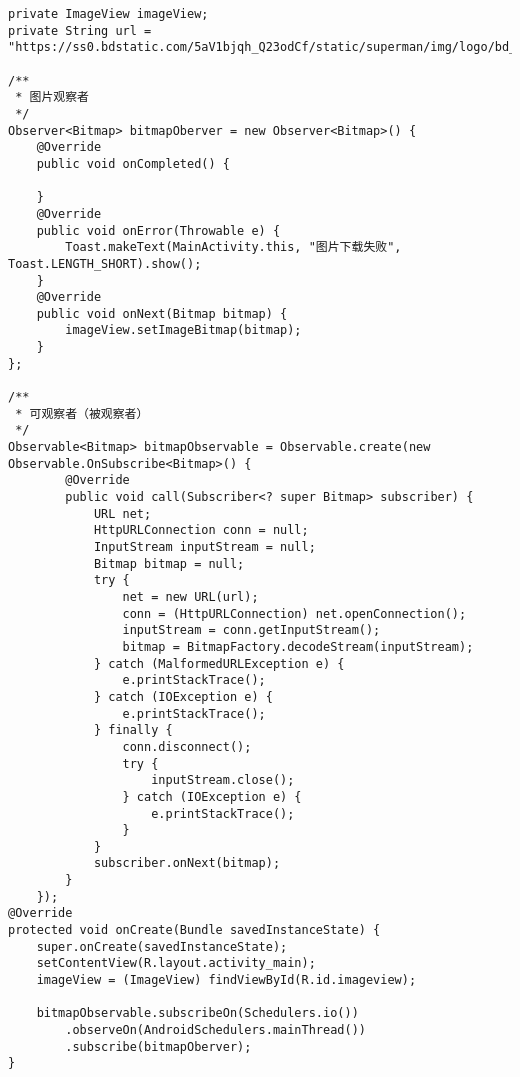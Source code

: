 \documentclass[9pt, b5paper]{article}
\begin{document}
\begin{verbatim}
private ImageView imageView;
private String url = "https://ss0.bdstatic.com/5aV1bjqh_Q23odCf/static/superman/img/logo/bd_logo1_31bdc765.png";

/**
 * 图片观察者
 */
Observer<Bitmap> bitmapOberver = new Observer<Bitmap>() {
    @Override
    public void onCompleted() {

    }
    @Override
    public void onError(Throwable e) {
        Toast.makeText(MainActivity.this, "图片下载失败", Toast.LENGTH_SHORT).show();
    }
    @Override
    public void onNext(Bitmap bitmap) {
        imageView.setImageBitmap(bitmap);
    }
};

/**
 * 可观察者（被观察者）
 */
Observable<Bitmap> bitmapObservable = Observable.create(new Observable.OnSubscribe<Bitmap>() {
        @Override
        public void call(Subscriber<? super Bitmap> subscriber) {
            URL net;
            HttpURLConnection conn = null;
            InputStream inputStream = null;
            Bitmap bitmap = null;
            try {
                net = new URL(url);
                conn = (HttpURLConnection) net.openConnection();
                inputStream = conn.getInputStream();
                bitmap = BitmapFactory.decodeStream(inputStream);
            } catch (MalformedURLException e) {
                e.printStackTrace();
            } catch (IOException e) {
                e.printStackTrace();
            } finally {
                conn.disconnect();
                try {
                    inputStream.close();
                } catch (IOException e) {
                    e.printStackTrace();
                }
            }
            subscriber.onNext(bitmap);
        }
    });
@Override
protected void onCreate(Bundle savedInstanceState) {
    super.onCreate(savedInstanceState);
    setContentView(R.layout.activity_main);
    imageView = (ImageView) findViewById(R.id.imageview);

    bitmapObservable.subscribeOn(Schedulers.io())
        .observeOn(AndroidSchedulers.mainThread())
        .subscribe(bitmapOberver);
}
\end{verbatim}
\end{document}
